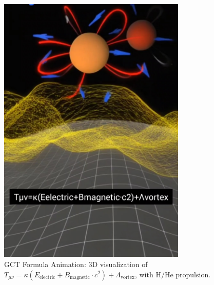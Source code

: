 \documentclass[a4paper,12pt]{article}
\begin{document}
\begin{figure}[h]
    \centering
    \includegraphics[width=0.8\textwidth]{figures/gct_formula.png}
    \caption{GCT Formula Animation: 3D visualization of \(T_{\mu \nu} = \kappa (E_{\text{electric}} + B_{\text{magnetic}} \cdot c^2) + \Lambda_{\text{vortex}}\), with \(\mathrm{H}/\mathrm{He}\) propulsion.}
    \label{fig:gct_formula}
\end{figure}



\end{document}
